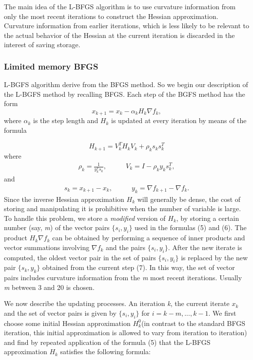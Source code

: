 The main idea of the L-BFGS algorithm is to use curvature information from only the most recent iterations to construct the Hessian approximation. Curvature information from earlier iterations, which is less likely to be relevant to the actual behavior of the Hessian at the current iteration is discarded in the interest of saving storage. 

\subsubsection{Limited memory BFGS}
L-BGFS algorithm derive from the BFGS method. So we begin our description of the L-BGFS method by recalling BFGS. 
Each step of the BGFS method has the form
\begin{equation}
\label{stepBFGS}
x_{k+1}=x_{k}-\alpha_{k}H_{k}\nabla f_{k} ,
\end{equation}
where $\alpha_{k}$ is the step length and $H_{k}$
is updated at every iteration by means of the formula

\begin{equation}
H_{k+1} = V^T_{k}H_{k}V_{k}+ \rho_{k}s_{k}s^T_{k}
\end{equation}
where 
\begin{align}
\rho_{k}=\frac{1}{y^T_{k}s_{k}}, & \qquad V_{k}=I-\rho_{k}y_{k}s^T_{k}, 
\end{align} 
and 
\begin{align}
s_{k}=x_{k+1}-x_{k}, & \qquad
y_{k}=\nabla f_{k+1} - \nabla f_{k}.
\end{align}
Since the inverse Hessian approximation $H_{k}$ will generally be dense, the cost of storing and manipulating it is prohibitive when the number of variable is large. To handle this problem, we store a \textit{modified} version of $H_{k}$, by storing a certain number (say, \textit{m}) of the vector pairs $\{s_{i},y_{i}\}$ used in the formulas (5) and (6). The product $H_{k}\nabla f_{k}$ can be obtained by performing a sequence of inner products and vector summations involving $\nabla f_{k}$ and the pairs $\{s_{i},y_{i}\}$. After the new iterate is computed, the oldest vector pair in the set of pairs $\{s_{i},y_{i}\}$ is replaced by the new pair $\{s_{k},y_{k}\}$ obtained from the current step (7).
In this way, the set of vector pairs includes curvature information from the \textit{m} most recent iterations. Usually \textit{m} between 3 and 20 is chosen. 

We now describe the updating processes. An iteration \textit{k}, the current iterate $x_{k}$ and the set of vector pairs is given by $\{s_{i},y_{i}\}$ for $i=k-m, ..., k-1$. We first choose some initial Hessian approximation $H^0_{k}$(in contrast to the standard BFGS iteration, this initial approximation is allowed to vary from iteration to iteration) and find by repeated application of the formula (5) that the L-BFGS approximation $H_{k}$ satisfies the following formula: 
\begin{equation} \label{8}
\begin{split}

\end{split}
\end{equation}

